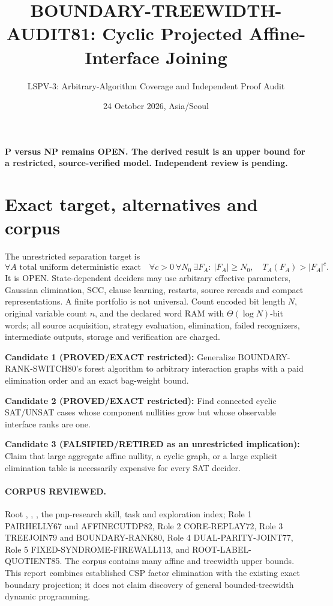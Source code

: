 \documentclass[11pt]{article}
\title{BOUNDARY-TREEWIDTH-AUDIT81: Cyclic Projected Affine-Interface Joining}
\author{LSPV-3: Arbitrary-Algorithm Coverage and Independent Proof Audit}
\date{24 October 2026, Asia/Seoul}
\begin{document}
\maketitle
\begin{center}\textbf{P versus NP remains OPEN. The derived result is an upper bound for a restricted, source-verified model. Independent review is pending.}\end{center}

\section{Exact target, alternatives and corpus}
The unrestricted separation target is
\[
\forall A\text{ total uniform deterministic exact}\quad
\forall c>0\ \forall N_0\ \exists F_A:\ 
|F_A|\ge N_0,\quad T_A(F_A)>|F_A|^c.
\]
It is OPEN. State-dependent deciders may use arbitrary effective parameters, Gaussian elimination, SCC, clause learning, restarts, source rereads and compact representations. A finite portfolio is not universal. Count encoded bit length $N$, original variable count $n$, and the declared word RAM with $\Theta(\log N)$-bit words; all source acquisition, strategy evaluation, elimination, failed recognizers, intermediate outputs, storage and verification are charged.

\noindent\textbf{Candidate 1 (PROVED/EXACT restricted):} Generalize BOUNDARY-RANK-SWITCH80's forest algorithm to arbitrary interaction graphs with a paid elimination order and an exact bag-weight bound.
\par\noindent\textbf{Candidate 2 (PROVED/EXACT restricted):} Find connected cyclic SAT/UNSAT cases whose component nullities grow but whose observable interface ranks are one.
\par\noindent\textbf{Candidate 3 (FALSIFIED/RETIRED as an unrestricted implication):} Claim that large aggregate affine nullity, a cyclic graph, or a large explicit elimination table is necessarily expensive for every SAT decider.

\paragraph{CORPUS REVIEWED.} Root , , , the pnp-research skill, task and exploration index; Role 1 PAIRHELLY67 and AFFINECUTDP82, Role 2 CORE-REPLAY72, Role 3 TREEJOIN79 and BOUNDARY-RANK80, Role 4 DUAL-PARITY-JOINT77, Role 5 FIXED-SYNDROME-FIREWALL113, and ROOT-LABEL-QUOTIENT85. The corpus contains many affine and treewidth upper bounds. This report combines established CSP factor elimination with the existing exact boundary projection; it does not claim discovery of general bounded-treewidth dynamic programming.
\end{document}
